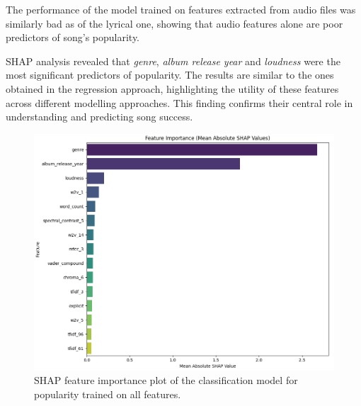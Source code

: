 The performance of the model trained on features extracted from audio files was
similarly bad as of the lyrical one, showing that audio features alone are 
poor predictors of song's popularity.


SHAP analysis revealed that \textit{genre}, \textit{album release year} and
\textit{loudness} were the most significant predictors of popularity. The
results are similar to the ones obtained in the regression approach,
highlighting the utility of  these features across different modelling
approaches. This finding confirms their central role in understanding and
predicting song success.

\begin{center}
\begin{figure}[H]
  \centering
  \includegraphics[width=5in]{img/feature_importance_popularity_clf.png}
  \caption{SHAP feature importance plot of the classification model for popularity trained on all features.}
  \label{Figure:fig_beh}
\end{figure}
\end{center}

